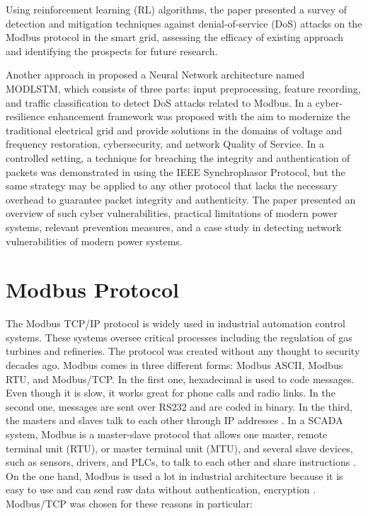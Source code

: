 \documentclass[letterpaper,10pt,conference]{IEEEtran}
\begin{document}
Using reinforcement learning (RL) algorithms, the paper \cite{R20} presented a survey of detection and mitigation techniques against denial-of-service (DoS) attacks on the Modbus protocol in the smart grid, assessing the efficacy of existing approach and identifying the prospects for future research.

Another approach in \cite{R21} proposed a Neural Network architecture named MODLSTM, which consists of three parts: input preprocessing, feature recording, and traffic classification to detect DoS attacks related to Modbus.
In \cite{R22} a cyber-resilience enhancement framework was proposed with the aim to modernize the traditional electrical grid and provide solutions in the domains of voltage and frequency restoration, cybersecurity, and network Quality of Service. In a controlled setting, a technique for breaching the integrity and authentication of packets was demonstrated in \cite{R23}  using the IEEE Synchrophasor Protocol, but the same strategy may be applied to any other protocol that lacks the necessary overhead to guarantee packet integrity and authenticity. The paper \cite{R24} presented an overview of such cyber vulnerabilities, practical limitations of modern power systems, relevant prevention measures, and a case study in detecting network vulnerabilities of modern power systems.




\section{Modbus Protocol}

The Modbus TCP/IP protocol is widely used in industrial automation control systems. These systems oversee critical processes including the regulation of gas turbines and refineries. The protocol was created without any thought to security decades ago. Modbus comes in three different forms: Modbus ASCII, Modbus RTU, and Modbus/TCP. In the first one, hexadecimal is used to code messages. Even though it is slow, it works great for phone calls and radio links. In the second one, messages are sent over RS232 and are coded in binary. In the third, the masters and slaves talk to each other through IP addresses \cite{R6}. In a SCADA system, Modbus is a master-slave protocol that allows one master, remote terminal unit (RTU), or master terminal unit (MTU), and several slave devices, such as sensors, drivers, and PLCs, to talk to each other and share instructions \cite{R7}. On the one hand, Modbus is used a lot in industrial architecture because it is easy to use and can send raw data without authentication, encryption \cite{R8}.
Modbus/TCP was chosen for these reasons in particular:
\end{document}
